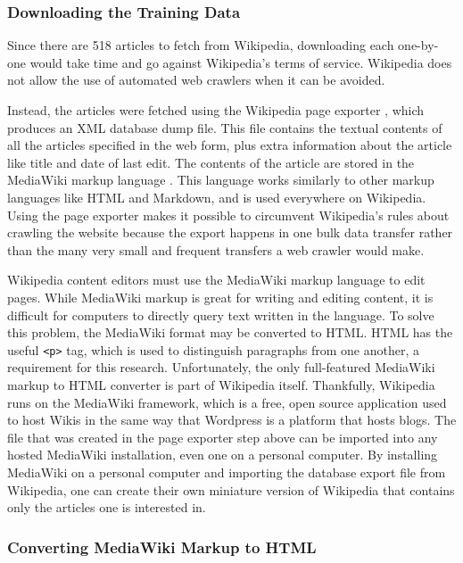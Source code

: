 \subsubsection{Downloading the Training Data}

Since there are 518 articles to fetch from Wikipedia, downloading each one-by-one would take time and go against Wikipedia's terms of service. Wikipedia does not allow the use of automated web crawlers when it can be avoided\cite{wiki-robots}.

Instead, the articles were fetched using the Wikipedia page exporter \cite{wiki-exporter}, which produces an XML database dump file.
This file contains the textual contents of all the articles specified in the web form, plus extra information about the article like title and date of last edit.
The contents of the article are stored in the MediaWiki markup language \cite{mediawiki-markup}.
This language works similarly to other markup languages like HTML and Markdown, and is used everywhere on Wikipedia.
Using the page exporter makes it possible to circumvent Wikipedia's rules about crawling the website because the export happens in one bulk data transfer rather than the many very small and frequent transfers a web crawler would make.

Wikipedia content editors must use the MediaWiki markup language to edit pages. 
While MediaWiki markup is great for writing and editing content, it is difficult for computers to directly query text written in the language.
To solve this problem, the MediaWiki format may be converted to HTML.
HTML has the useful {\tt <p>} tag, which is used to distinguish paragraphs from one another, a requirement for this research. 
Unfortunately, the only full-featured MediaWiki markup to HTML converter is part of Wikipedia itself.
Thankfully, Wikipedia runs on the MediaWiki framework, which is a free, open source application used to host Wikis in the same way that Wordpress is a platform that hosts blogs.
The file that was created in the page exporter step above can be imported into any hosted MediaWiki installation, even one on a personal computer.
By installing MediaWiki on a personal computer and importing the database export file from Wikipedia, one can create their own miniature version of Wikipedia that contains only the articles one is interested in.

\subsubsection{Converting MediaWiki Markup to HTML}

